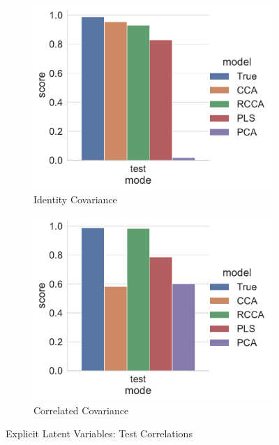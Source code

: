\begin{figure}
    \centering
    \begin{subfigure}{0.49\linewidth}
        \centering
        \includegraphics[width=\linewidth]{figures/simulated/Train_Test_Scores_Identity_Covariance_implicit.pdf}
        \caption{Identity Covariance}
    \end{subfigure}
%
    \begin{subfigure}{0.49\linewidth}
        \centering
        \includegraphics[width=\linewidth]{figures/simulated/Train_Test_Scores_Correlated_Covariance_implicit.pdf}
        \caption{Correlated Covariance}
    \end{subfigure}
    \caption{Explicit Latent Variables: Test Correlations}\label{fig:implicit-test-correlations}
\end{figure}

